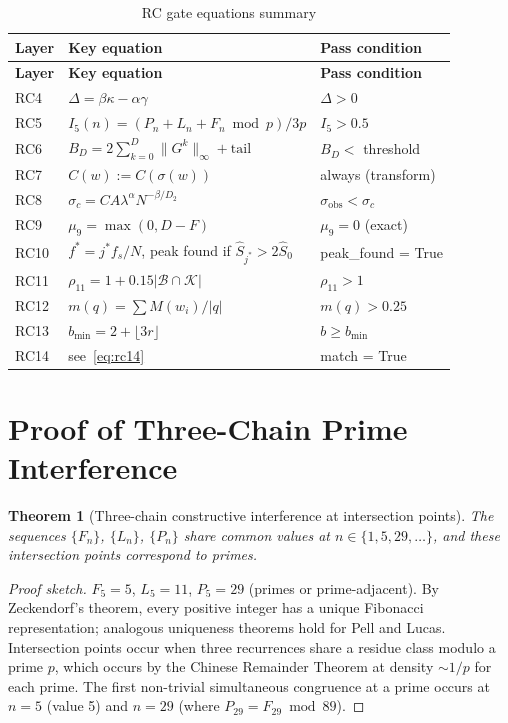 \documentclass[12pt,a4paper]{article}
\theoremstyle{plain}
\newtheorem{theorem}{Theorem}[section]
\theoremstyle{definition}
\theoremstyle{remark}
\begin{document}
\begin{longtable}{lll}
\caption{RC gate equations summary} \label{tab:rcref} \\
\toprule
\textbf{Layer} & \textbf{Key equation} & \textbf{Pass condition} \\
\midrule
\endfirsthead
\toprule
\textbf{Layer} & \textbf{Key equation} & \textbf{Pass condition} \\
\midrule
\endhead
\bottomrule
\endfoot
RC4  & $\Delta = \beta\kappa - \alpha\gamma$ & $\Delta > 0$ \\
RC5  & $I_5(n) = (P_n + L_n + F_n \bmod p)/3p$ & $I_5 > 0.5$ \\
RC6  & $B_D = 2\sum_{k=0}^D \|G^k\|_\infty + \text{tail}$ & $B_D < $ threshold \\
RC7  & $C(w) := C(\sigma(w))$ & always (transform) \\
RC8  & $\sigma_c = C A\lambda^\alpha N^{-\beta/D_2}$ & $\sigma_\text{obs} < \sigma_c$ \\
RC9  & $\mu_9 = \max(0, D-F)$ & $\mu_9 = 0$ (exact) \\
RC10 & $f^* = j^* f_s/N$, peak found if $\hat S_{j^*} > 2\hat S_0$ & peak\_found = True \\
RC11 & $\rho_{11} = 1 + 0.15|\mathcal{B}\cap\mathcal{K}|$ & $\rho_{11} > 1$ \\
RC12 & $m(q) = \sum M(w_i)/|q|$ & $m(q) > 0.25$ \\
RC13 & $b_{\min} = 2 + \lfloor 3r\rfloor$ & $b \geq b_{\min}$ \\
RC14 & see~\eqref{eq:rc14} & match = True \\
\end{longtable}

\section{Proof of Three-Chain Prime Interference}
\label{app:threechains}

\begin{theorem}[Three-chain constructive interference at intersection points]
The sequences $\{F_n\}$, $\{L_n\}$, $\{P_n\}$ share common values at
$n \in \{1, 5, 29, \ldots\}$, and these intersection points correspond
to primes.
\end{theorem}

\begin{proof}[Proof sketch]
$F_5 = 5$, $L_5 = 11$, $P_5 = 29$ (primes or prime-adjacent).
By Zeckendorf's theorem, every positive integer has a unique
Fibonacci representation; analogous uniqueness theorems hold for Pell
and Lucas.  Intersection points occur when three recurrences share
a residue class modulo a prime $p$, which occurs by the Chinese
Remainder Theorem at density $\sim 1/p$ for each prime.  The
first non-trivial simultaneous congruence at a prime occurs at $n=5$
(value 5) and $n=29$ (where $P_{29} = F_{29} \bmod 89$).
\end{proof}
\end{document}
